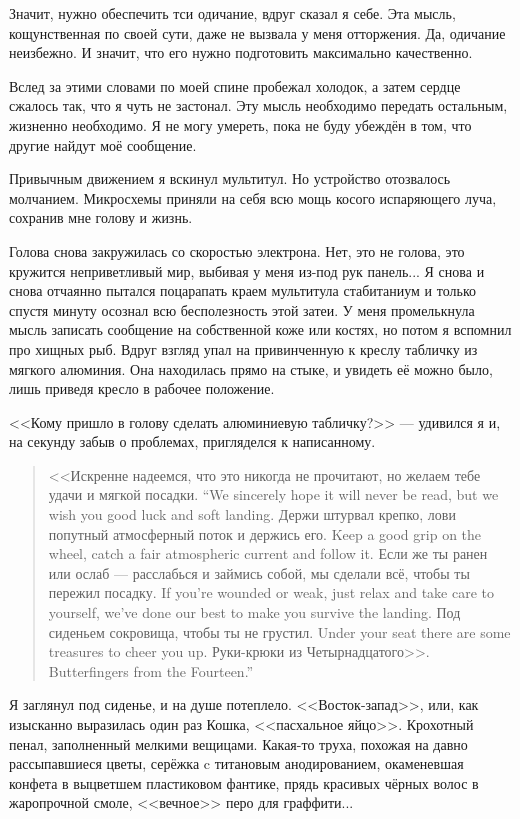 Значит, нужно обеспечить тси одичание, вдруг сказал я себе.
Эта мысль, кощунственная по своей сути, даже не вызвала у меня отторжения.
Да, одичание неизбежно.
И значит, что его нужно подготовить максимально качественно.

Вслед за этими словами по моей спине пробежал холодок, а затем сердце сжалось так, что я чуть не застонал.
Эту мысль необходимо передать остальным, жизненно необходимо.
Я не могу умереть, пока не буду убеждён в том, что другие найдут моё сообщение.

Привычным движением я вскинул мультитул.
Но устройство отозвалось молчанием.
Микросхемы приняли на себя всю мощь косого испаряющего луча, сохранив мне голову и жизнь.

Голова снова закружилась со скоростью электрона.
Нет, это не голова, это кружится неприветливый мир, выбивая у меня из-под рук панель...
Я снова и снова отчаянно пытался поцарапать краем мультитула стабитаниум и только спустя минуту осознал всю бесполезность этой затеи.
У меня промелькнула мысль записать сообщение на собственной коже или костях, но потом я вспомнил про хищных рыб.
Вдруг взгляд упал на привинченную к креслу табличку из мягкого алюминия.
Она находилась прямо на стыке, и увидеть её можно было, лишь приведя кресло в рабочее положение.

<<Кому пришло в голову сделать алюминиевую табличку?>> --- удивился я и, на секунду забыв о проблемах, пригляделся к написанному.

\begin{quote}
{<<Искренне надеемся, что это никогда не прочитают, но желаем тебе удачи и мягкой посадки.}
{``We sincerely hope it will never be read, but we wish you good luck and soft landing.}
{Держи штурвал крепко, лови попутный атмосферный поток и держись его.}
{Keep a good grip on the wheel, catch a fair atmospheric current and follow it.}
{Если же ты ранен или ослаб --- расслабься и займись собой, мы сделали всё, чтобы ты пережил посадку.}
{If you're wounded or weak, just relax and take care to yourself, we've done our best to make you survive the landing.}
{Под сиденьем сокровища, чтобы ты не грустил.}
{Under your seat there are some treasures to cheer you up.}
{Руки-крюки из Четырнадцатого>>.}
{Butterfingers from the Fourteen.''}
\end{quote}

Я заглянул под сиденье, и на душе потеплело.
<<Восток-запад>>, или, как изысканно выразилась один раз Кошка, <<пасхальное яйцо>>.
Крохотный пенал, заполненный мелкими вещицами.
Какая-то труха, похожая на давно рассыпавшиеся цветы, серёжка c титановым анодированием, окаменевшая конфета в выцветшем пластиковом фантике, прядь красивых чёрных волос в жаропрочной смоле, <<вечное>> перо для граффити...

